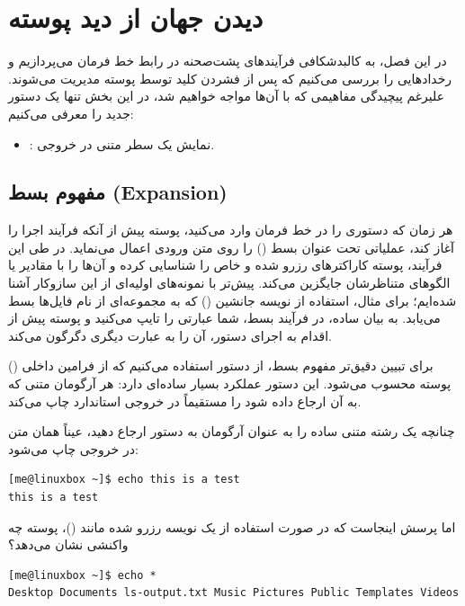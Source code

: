 \chapter{دیدن جهان از دید پوسته}

در این فصل، به کالبدشکافی فرآیندهای پشت‌صحنه در رابط خط فرمان می‌پردازیم و رخدادهایی را بررسی می‌کنیم که پس از فشردن کلید  توسط پوسته  مدیریت می‌شوند. علیرغم پیچیدگی مفاهیمی که با آن‌ها مواجه خواهیم شد، در این بخش تنها یک دستور جدید را معرفی می‌کنیم:

\begin{itemize}
  \item {}: نمایش یک سطر متنی در خروجی.
\end{itemize}

\section{مفهوم بسط (Expansion)}

هر زمان که دستوری را در خط فرمان وارد می‌کنید، پوسته  پیش از آنکه فرآیند اجرا را آغاز کند، عملیاتی تحت عنوان بسط () را روی متن ورودی اعمال می‌نماید. در طی این فرآیند، پوسته کاراکترهای رزرو شده و خاص را شناسایی کرده و آن‌ها را با مقادیر یا الگوهای متناظرشان جایگزین می‌کند. پیش‌تر با نمونه‌های اولیه‌ای از این سازوکار آشنا شده‌ایم؛ برای مثال، استفاده از نویسه جانشین () \cmd{*} که به مجموعه‌ای از نام‌ فایل‌ها بسط می‌یابد. به بیان ساده، در فرآیند بسط، شما عبارتی را تایپ می‌کنید و پوسته پیش از اقدام به اجرای دستور، آن را به عبارت دیگری دگرگون می‌کند.

برای تبیین دقیق‌تر مفهوم بسط، از دستور  استفاده می‌کنیم که از فرامین داخلی () پوسته محسوب می‌شود. این دستور عملکرد بسیار ساده‌ای دارد: هر آرگومان متنی که به آن ارجاع داده شود را مستقیماً در خروجی استاندارد چاپ می‌کند.

چنانچه یک رشته متنی ساده را به عنوان آرگومان به دستور  ارجاع دهید، عیناً همان متن در خروجی چاپ می‌شود:

\begin{latin}
\begin{lstlisting}
[me@linuxbox ~]$ echo this is a test
this is a test
\end{lstlisting}
\end{latin}

اما پرسش اینجاست که در صورت استفاده از یک نویسه رزرو شده مانند \cmd{*} ()، پوسته چه واکنشی نشان می‌دهد؟

\begin{latin}
\begin{lstlisting}
[me@linuxbox ~]$ echo *
Desktop Documents ls-output.txt Music Pictures Public Templates Videos
\end{lstlisting}
\end{latin}

